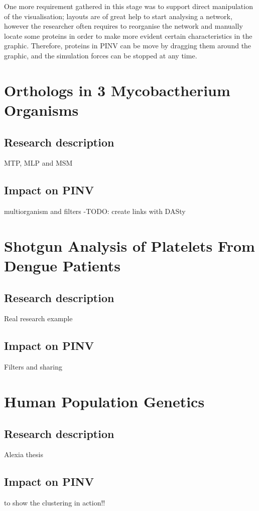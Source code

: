 One more requirement gathered in this stage was to support direct manipulation of the visualisation; layouts are of great help to start analysing a network, however the researcher often requires to reorganise the network and manually locate some proteins in order to make more evident certain characteristics in the graphic. Therefore, proteins in PINV can be move by dragging them around the graphic, and the simulation forces can be stopped at any time.

\section{Orthologs in 3 Mycobactherium Organisms}\label{sec:orthologs}
\subsection{Research description}
MTP, MLP and MSM

\subsection{Impact on PINV}
multiorganism and filters -TODO: create links with DASty

\section{Shotgun Analysis of Platelets From Dengue Patients}
\label{sec:dengue}
\subsection{Research description}
Real research example

\subsection{Impact on PINV}
Filters and sharing

\section{Human Population Genetics}
\label{sec:pop_genetics}
\subsection{Research description}
Alexia thesis
\subsection{Impact on PINV}
to show the clustering in action!! 


